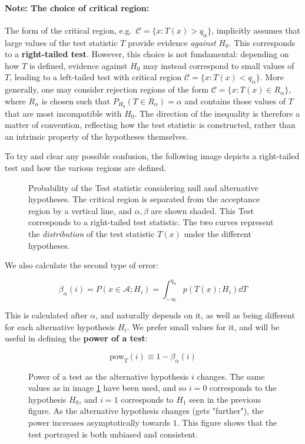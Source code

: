 \paragraph{Note: The choice of critical region:}
The form of the critical region, e.g.\ $\mathcal{C} = \{x : T(x) > q_\alpha\}$, implicitly assumes that large values of the test statistic $T$ provide evidence \emph{against} $H_0$. This corresponds to a \textbf{right-tailed test}. However, this choice is not fundamental: depending on how $T$ is defined, evidence against $H_0$ may instead correspond to small values of $T$, leading to a left-tailed test with critical region $\mathcal{C} = \{x : T(x) < q_\alpha\}$. More generally, one may consider rejection regions of the form $\mathcal{C} = \{x : T(x) \in R_\alpha\}$, where $R_\alpha$ is chosen such that $P_{H_0}(T \in R_\alpha) = \alpha$ and contains those values of $T$ that are most incompatible with $H_0$. The direction of the inequality is therefore a matter of convention, reflecting how the test statistic is constructed, rather than an intrinsic property of the hypotheses themselves.


To try and clear any possible confusion, the following image depicts a right-tailed test and how the various regions are defined.


\begin{figure}[H]
	\centering
	
	\caption{Probability of the Test statistic considering null and alternative hypotheses. The critical region is separated from the acceptance region by a vertical line, and $\alpha, \beta$ are shown shaded. This Test corresponds to a right-tailed test statistic. The two curves represent the \emph{distribution} of the test statistic $T(x)$ under the different hypotheses.}
	\label{fig:hypothesis_testing_errors}
\end{figure}

We also calculate the second type of error:

	\[
	\beta_\alpha(i) = P(x\in \mathcal{A};H_i) = \int_{-\infty}^{q_\alpha}p(T(x);H_i)\dd T
	\]

This is calculated after $\alpha$, and naturally depends on it, as well as being different for each alternative hypothesis $H_i$. We prefer small values for it, and will be useful in defining the \textbf{power of a test}: 

	\[
	\text{pow}_T(i) \equiv 1- \beta_\alpha(i)
	\tag{Power of a Test}
	\]

\begin{figure}[H]
	\centering
	
	\caption{Power of a test as the alternative hypothesis $i$ changes. The same values as in image \ref{fig:hypothesis_testing_errors} have been used, and so $i=0$ corresponds to the hypothesis $H_0$, and $i=1$ corresponds to $H_1$ seen in the previous figure. As the alternative hypothesis changes (gets "further"), the power increases asymptotically towards $1$. This figure shows that the test portrayed is both unbiased and consistent.}
	\label{fig:hypothesis_testing_power}
\end{figure}


